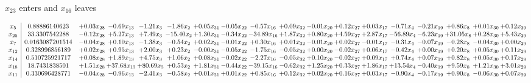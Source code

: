 \documentclass[9pt]{article}
\begin{document}
 $ x_{23} $ enters and $ x_{16} $ leaves 

 \[\begin{array}{c| c c@{\hskip 2pt} c@{\hskip 2pt} c@{\hskip 2pt} c@{\hskip 2pt} c@{\hskip 2pt} c@{\hskip 2pt} c@{\hskip 2pt} c@{\hskip 2pt} c@{\hskip 2pt} c@{\hskip 2pt} c@{\hskip 2pt} c@{\hskip 2pt} c@{\hskip 2pt} c@{\hskip 2pt} c@{\hskip 2pt} c@{\hskip 2pt} }
 x_{5}   &  0.88886140623 & +  0.03 x_{28} & -0.69 x_{13} & -1.21 x_{3} & -1.86 x_{2} & +  0.05 x_{31} & -0.05 x_{22} & -0.57 x_{16} & +  0.09 x_{32} & -0.01 x_{20} & +  0.12 x_{27} & +  0.03 x_{17} & -0.71 x_{4} & -0.21 x_{19} & +  0.86 x_{8} & +  0.01 x_{30} & +  0.12 x_{29}\\
 x_{25}   &  33.3307542288 & -0.12 x_{28} & +  5.27 x_{13} & +  7.49 x_{3} & -15.40 x_{2} & +  1.30 x_{31} & -0.34 x_{22} & -34.89 x_{16} & +  1.87 x_{32} & +  0.80 x_{20} & +  4.59 x_{27} & +  2.87 x_{17} & -56.89 x_{4} & -6.23 x_{19} & + 31.05 x_{8} & +  0.28 x_{30} & +  5.43 x_{29}\\
 x_{7}   &  0.0163087201514 & -0.04 x_{28} & +  0.10 x_{13} & -1.38 x_{3} & -0.54 x_{2} & +  0.02 x_{31} & -0.01 x_{22} & +  0.30 x_{16} & +  0.01 x_{32} & -0.01 x_{20} & +  0.02 x_{27} & -0.01 x_{17} & -0.31 x_{4} & -0.07 x_{19} & -0.28 x_{8} & -0.04 x_{30} & +  0.00 x_{29}\\
 x_{12}   &  0.328996856189 & +  0.02 x_{28} & +  0.95 x_{13} & +  2.00 x_{3} & +  0.23 x_{2} & -0.00 x_{31} & -0.05 x_{22} & -1.75 x_{16} & -0.05 x_{32} & +  0.00 x_{20} & -0.02 x_{27} & +  0.06 x_{17} & -0.42 x_{4} & +  0.00 x_{19} & +  0.20 x_{8} & +  0.05 x_{30} & +  0.11 x_{29}\\
 x_{14}   &  0.510725921717 & +  0.08 x_{28} & +  1.89 x_{13} & +  4.75 x_{3} & +  1.06 x_{2} & +  0.08 x_{31} & -0.02 x_{22} & -2.27 x_{16} & -0.05 x_{32} & +  0.10 x_{20} & -0.02 x_{27} & +  0.09 x_{17} & +  0.74 x_{4} & +  0.07 x_{19} & +  0.82 x_{8} & +  0.05 x_{30} & +  0.17 x_{29}\\
 x_{18}   &  18.7431838501 & +  1.51 x_{28} & + 37.68 x_{13} & + 80.69 x_{3} & +  0.53 x_{2} & +  1.81 x_{31} & -0.44 x_{22} & -39.15 x_{16} & -0.62 x_{32} & +  1.25 x_{20} & +  0.33 x_{27} & +  1.86 x_{17} & + 13.54 x_{4} & -0.40 x_{19} & +  9.59 x_{8} & +  1.21 x_{30} & +  3.01 x_{29}\\
 x_{11}   &  0.330696428771 & -0.04 x_{28} & -0.96 x_{13} & -2.41 x_{3} & -0.58 x_{2} & +  0.01 x_{31} & +  0.01 x_{22} & +  0.85 x_{16} & +  0.12 x_{32} & +  0.02 x_{20} & +  0.16 x_{27} & +  0.03 x_{17} & -0.90 x_{4} & -0.17 x_{19} & +  0.90 x_{8} & -0.06 x_{30} & +  0.07 x_{29}\\

\end{array}\]
\end{document}
